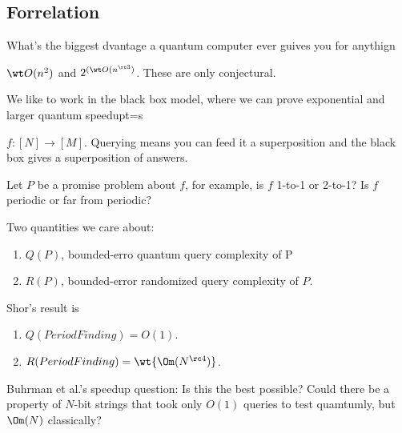 
\subsection{Forrelation}

What's the biggest dvantage a quantum computer ever guives you for anythign

$\wt O(n^2)$ and $2^{(\wt O(n^{\rc3})}$. These are only conjectural.

We like to work in the black box model, where we can prove exponential and larger quantum speedupt=s

$f:[N]\to [M]$. Querying means you can feed it a superposition and the black box gives a superposition of answers. 

Let $P$ be a promise problem about $f$, for example, is $f$ 1-to-1 or 2-to-1? Is $f$ periodic or far from periodic?

Two quantities we care about:
\begin{enumerate}
\item $Q(P)$, bounded-erro quantum query complexity of P
\item $R(P)$, bounded-error randomized query complexity of $P$. 
\end{enumerate}
Shor's result is
\begin{enumerate}
\item $Q(PeriodFinding)=O(1)$. %
\item $R(PeriodFinding)=\wt{\Om(N^{\rc 4})}$.
\end{enumerate}

Buhrman et al.'s speedup question:
Is this the best possible? Could there be a property of $N$-bit strings that took only $O(1)$ queries to test quamtumly, but $\Om(N)$ classically?

